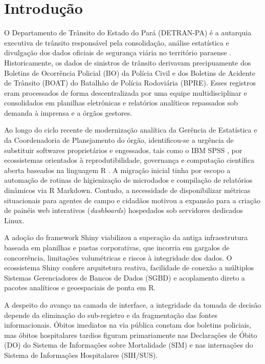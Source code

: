 \documentclass[sigconf, nonacm, screen, language=portuguese, language=spanish, language={main=english}]{acmart}
\begin{document}
\maketitle
{}

\section{Introdução}
O Departamento de Trânsito do Estado do Pará (DETRAN-PA) é a autarquia executiva de trânsito responsável pela consolidação, análise estatística e divulgação dos dados oficiais de segurança viária no território paraense \cite{detran2024}. Historicamente, os dados de sinistros de trânsito derivavam precipuamente dos Boletins de Ocorrência Policial (BO) da Polícia Civil e dos Boletins de Acidente de Trânsito (BOAT) do Batalhão de Polícia Rodoviária (BPRE). Esses registros eram processados de forma descentralizada por uma equipe multidisciplinar e consolidados em planilhas eletrônicas e relatórios analíticos repassados sob demanda à imprensa e a órgãos gestores.

Ao longo do ciclo recente de modernização analítica da Gerência de Estatística e da Coordenadoria de Planejamento do órgão, identificou-se a urgência de substituir softwares proprietários e engessados, tais como o IBM SPSS \cite{ibm2020}, por ecossistemas orientados à reprodutibilidade, governança e computação científica aberta baseados na linguagem R \cite{rcore2024}. A migração inicial tinha por escopo a automação de rotinas de higienização de microdados e compilação de relatórios dinâmicos via R Markdown. Contudo, a necessidade de disponibilizar métricas situacionais para agentes de campo e cidadãos motivou a expansão para a criação de painéis web interativos (\textit{dashboards}) hospedados sob servidores dedicados Linux.

A adoção do framework Shiny \cite{shiny2024} viabilizou a superação da antiga infraestrutura baseada em planilhas e pastas corporativas, que incorria em gargalos de concorrência, limitações volumétricas e riscos à integridade dos dados. O ecossistema Shiny confere arquitetura reativa, facilidade de conexão a múltiplos Sistemas Gerenciadores de Bancos de Dados (SGBD) e acoplamento direto a pacotes analíticos e geoespaciais de ponta em R.

A despeito do avanço na camada de interface, a integridade da tomada de decisão depende da eliminação do sub-registro e da fragmentação das fontes informacionais. Óbitos imediatos na via pública constam dos boletins policiais, mas óbitos hospitalares tardios figuram primariamente nas Declarações de Óbito (DO) do Sistema de Informações sobre Mortalidade (SIM) e nas internações do Sistema de Informações Hospitalares (SIH/SUS).
\end{document}
